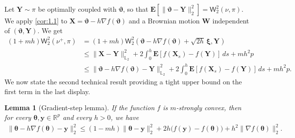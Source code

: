 \documentclass[aos,reqno]{imsart}
\newcommand\bY{\boldsymbol Y}
\newcommand\bX{\boldsymbol X}
\newcommand\bW{\boldsymbol W}
\newcommand\by{\boldsymbol y}
\newcommand\bxi{\boldsymbol\xi}
\newcommand\btheta{\boldsymbol\theta}
\newcommand\bvartheta{\boldsymbol\vartheta}
\def\wass{\mathsf{W}}
\newtheorem{lemma}{Lemma}
\theoremstyle{definition}
\begin{document}
Let $\bY\sim \pi$ be optimally coupled with $\bvartheta$, 
so that $\mathbf E[\|\bvartheta - \bY\|_2^2] = \wass_2^2
(\nu,\pi)$. We apply \eqref{cor:1.1} to $\bX = \bvartheta 
- h\nabla f(\bvartheta)$ and a Brownian motion $\bW$ 
independent of $(\bvartheta,\bY)$. We get
\begin{align}
    (1+mh)\wass_2^2(\nu^+\!\!, \pi) 
    &= (1+mh)\wass_2^2(\bvartheta-h\nabla f(\bvartheta) + 
    \sqrt{2h}\,\bxi, \bY) \\
    &\leqslant \|\bX - \bY \|^2_{\mathbb L_2}
    +2\int_0^h\mathbf E[f(\bX_s) -f(\bY)]
    \,ds + mh^2p\\
    &\leqslant \|\bvartheta - h\nabla f(\bvartheta) - 
    \bY \|^2_{\mathbb L_2}\!
    +2\!\int_0^h\!\mathbf E[f(\bX_s) -f(\bY)]\,ds 
    + mh^2p.
    \label{eq:22}
\end{align}
We now state the second technical result providing
a tight upper bound on the first term in the last display. 

\begin{lemma}[Gradient-step lemma]\label{lem:basic-gd}
    If the function $f$ is $m$-strongly convex, then for
    every $\btheta,\by\in\mathbb R^p$ and every $h>0$, we have
    \begin{align}
        \|\btheta-h\nabla f(\btheta)-\by\|_2^2
        \leqslant
        (1-mh)\|\btheta-\by\|_2^2
        + 2h\big(f(\by)-f(\btheta)\big)
        + h^2\|\nabla f(\btheta)\|_2^2.
        \label{eq:basic-gd}
    \end{align}
\end{lemma}
\end{document}
